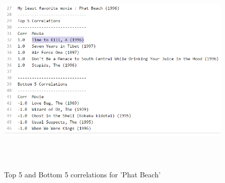 \documentclass{article}
\begin{document}
\begin{figure}[H]
 \centering
 	\includegraphics[height=10cm]{corr2.png}
  \caption{Top 5 and Bottom 5 correlations for 'Phat Beach'}
\end{figure}



\end{document}
